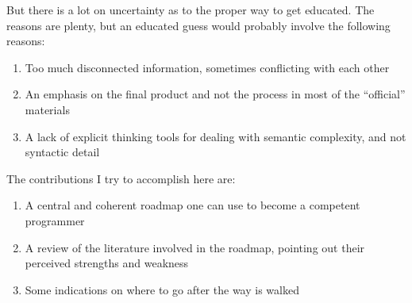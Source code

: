 But there is a lot on uncertainty as to the proper way to get educated. The
reasons are plenty, but an educated guess would probably involve the following
reasons:

\begin{enumerate}
    \item Too much disconnected information, sometimes conflicting with each other
    \item An emphasis on the final product and not the process in most of the
    ``official'' materials \cite{education:harvey__symbolic_programming_vs_AP_curriculum}
    \item A lack of explicit thinking tools for dealing with semantic
    complexity, and not syntactic detail\cite{education:felleisen__sicsc}
\end{enumerate}


The contributions I try to accomplish here are:

\begin{enumerate}
    \item A central and coherent roadmap one can use to become a competent
    programmer
    \item A review of the literature involved in the roadmap, pointing out their
    perceived strengths and weakness

    \item Some indications on where to go after the way is walked
\end{enumerate}
